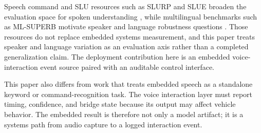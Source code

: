 Speech command and SLU resources such as SLURP and SLUE broaden the evaluation space for spoken understanding \cite{bastianelli-etal-2020-slurp,shon2022slue}, while multilingual benchmarks such as ML-SUPERB motivate speaker and language robustness questions \cite{shi23g_interspeech}. Those resources do not replace embedded systems measurement, and this paper treats speaker and language variation as an evaluation axis rather than a completed generalization claim. The deployment contribution here is an embedded voice-interaction event source paired with an auditable control interface.

This paper also differs from work that treats embedded speech as a standalone keyword or command-recognition task. The voice interaction layer must report timing, confidence, and bridge state because its output may affect vehicle behavior. The embedded result is therefore not only a model artifact; it is a systems path from audio capture to a logged interaction event.
